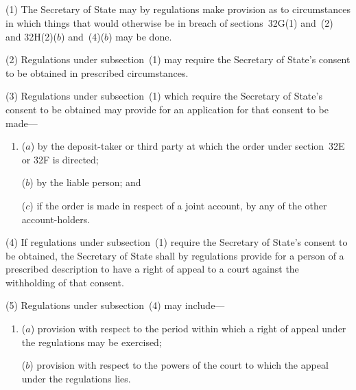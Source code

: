 \documentclass[12pt,a4paper]{article}
\begin{document}

\subsection[32I. Power to disapply sections 32G(1) and~(2) and~32H(2)($b$) and~(4)($b$)]{}

(1) The Secretary of State may by regulations make provision as to
circumstances in which things that would otherwise be in breach of sections~32G(1) and~(2) and 32H(2)($b$) and~(4)($b$) may be done.

(2) Regulations under subsection~(1) may require the 
Secretary of State's  %
consent
to be obtained in prescribed circumstances.

(3) Regulations under subsection~(1) which require the 
Secretary of State's  %
consent
to be obtained may provide for an application for that consent to be made---
\begin{enumerate}\item[]
($a$) by the deposit-taker or third party at which the order under section~32E or
32F is directed;

($b$) by the liable person; and

($c$) if the order is made in respect of a joint account, by any of the other account-holders.
\end{enumerate}

(4) If regulations under subsection~(1) require the 
Secretary of State's  %
consent to
be obtained, the Secretary of State shall by regulations provide for a person of a
prescribed description to have a right of appeal to a court against the withholding of
that consent.

(5) Regulations under subsection~(4) may include---
\begin{enumerate}\item[]
($a$) provision with respect to the period within which a right of appeal under the
regulations may be exercised;

($b$) provision with respect to the powers of the court to which the appeal under
the regulations lies.
\end{enumerate}
\end{document}
